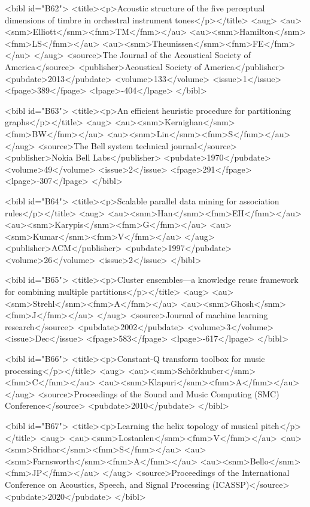 \documentclass{bmcart}
\begin{document}
\begin{backmatter}
{<bibl id="B62">
  <title><p>Acoustic structure of the five perceptual dimensions of timbre in
  orchestral instrument tones</p></title>
  <aug>
    <au><snm>Elliott</snm><fnm>TM</fnm></au>
    <au><snm>Hamilton</snm><fnm>LS</fnm></au>
    <au><snm>Theunissen</snm><fnm>FE</fnm></au>
  </aug>
  <source>The Journal of the Acoustical Society of America</source>
  <publisher>Acoustical Society of America</publisher>
  <pubdate>2013</pubdate>
  <volume>133</volume>
  <issue>1</issue>
  <fpage>389</fpage>
  <lpage>-404</lpage>
</bibl>

<bibl id="B63">
  <title><p>An efficient heuristic procedure for partitioning
  graphs</p></title>
  <aug>
    <au><snm>Kernighan</snm><fnm>BW</fnm></au>
    <au><snm>Lin</snm><fnm>S</fnm></au>
  </aug>
  <source>The Bell system technical journal</source>
  <publisher>Nokia Bell Labs</publisher>
  <pubdate>1970</pubdate>
  <volume>49</volume>
  <issue>2</issue>
  <fpage>291</fpage>
  <lpage>-307</lpage>
</bibl>

<bibl id="B64">
  <title><p>Scalable parallel data mining for association rules</p></title>
  <aug>
    <au><snm>Han</snm><fnm>EH</fnm></au>
    <au><snm>Karypis</snm><fnm>G</fnm></au>
    <au><snm>Kumar</snm><fnm>V</fnm></au>
  </aug>
  <publisher>ACM</publisher>
  <pubdate>1997</pubdate>
  <volume>26</volume>
  <issue>2</issue>
</bibl>

<bibl id="B65">
  <title><p>Cluster ensembles---a knowledge reuse framework for combining
  multiple partitions</p></title>
  <aug>
    <au><snm>Strehl</snm><fnm>A</fnm></au>
    <au><snm>Ghosh</snm><fnm>J</fnm></au>
  </aug>
  <source>Journal of machine learning research</source>
  <pubdate>2002</pubdate>
  <volume>3</volume>
  <issue>Dec</issue>
  <fpage>583</fpage>
  <lpage>-617</lpage>
</bibl>

<bibl id="B66">
  <title><p>Constant-Q transform toolbox for music processing</p></title>
  <aug>
    <au><snm>Sch{\"o}rkhuber</snm><fnm>C</fnm></au>
    <au><snm>Klapuri</snm><fnm>A</fnm></au>
  </aug>
  <source>Proceedings of the Sound and Music Computing (SMC)
  Conference</source>
  <pubdate>2010</pubdate>
</bibl>

<bibl id="B67">
  <title><p>Learning the helix topology of musical pitch</p></title>
  <aug>
    <au><snm>Lostanlen</snm><fnm>V</fnm></au>
    <au><snm>Sridhar</snm><fnm>S</fnm></au>
    <au><snm>Farnsworth</snm><fnm>A</fnm></au>
    <au><snm>Bello</snm><fnm>JP</fnm></au>
  </aug>
  <source>Proceedings of the International Conference on Acoustics, Speech, and
  Signal Processing (ICASSP)</source>
  <pubdate>2020</pubdate>
</bibl>

}
\end{backmatter}
\end{document}
